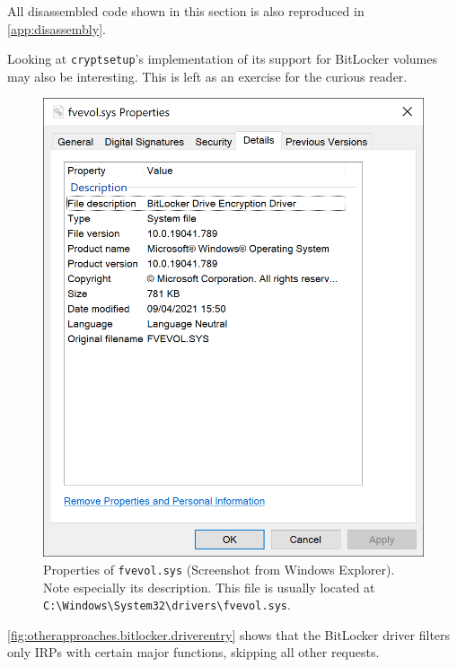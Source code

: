 All disassembled code shown in this section is also reproduced in \autoref{app:disassembly}.

Looking at \texttt{cryptsetup}'s implementation of its support for BitLocker volumes may also be interesting. This is left as an exercise for the curious reader.

\begin{figure}[htb!]
	\center
	\includegraphics[scale=0.7]{../img/otherapproaches.bitlocker.fvevol.png}
	\caption[
		Properties of \texttt{fvevol.sys}
	]{
		Properties of \texttt{fvevol.sys} (Screenshot from Windows Explorer). Note especially its description. This file is usually located at \texttt{C:\textbackslash Windows\textbackslash System32\textbackslash drivers\textbackslash fvevol.sys}.
	}
	\label{fig:otherapproaches.bitlocker.fvevol}
\end{figure}

\autoref{fig:otherapproaches.bitlocker.driverentry} shows that the BitLocker driver filters only IRPs with certain major functions, skipping all other requests. 

